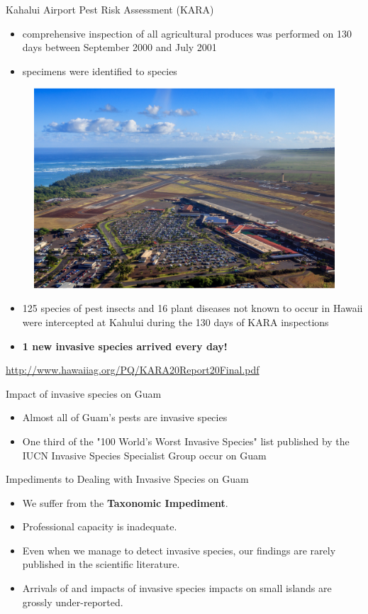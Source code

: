 \documentclass[]{beamer}
\begin{document}
\begin{frame}{Kahalui Airport Pest Risk Assessment (KARA)}
	\begin{itemize}
		\item comprehensive inspection of all agricultural produces was performed on 130 days between September 2000 and July 2001
		\item specimens were identified to species
	\end{itemize}
	\begin{figure}
		\includegraphics[height=0.35\textheight]{kahului-airport.jpg}
	\end{figure}
	\begin{itemize}
		\item 125 species of pest insects and 16 plant diseases not known to occur in Hawaii were intercepted at Kahului during the 130 days of KARA inspections
		\item \textbf{1 new invasive species arrived every day!}
	\end{itemize}
	\url{http://www.hawaiiag.org/PQ/KARA20Report20Final.pdf}
\end{frame}

\begin{frame}{Impact of invasive species on Guam}
	\begin{itemize}
		\item Almost all of Guam's pests are invasive species
		\item One third of the "100 World's Worst Invasive Species" list published by the IUCN Invasive Species Specialist Group  occur on Guam
	\end{itemize}
\end{frame}

\begin{frame}{Impediments to Dealing with Invasive Species on Guam}
	\begin{itemize}
		\item We suffer from the \textbf{Taxonomic Impediment}.
		\item Professional capacity is inadequate.
		\item Even when we manage to detect invasive species, our findings are rarely published in the scientific literature. 
		\item Arrivals of and impacts of invasive species impacts on small islands are grossly under-reported.
	\end{itemize}
\end{frame}
\end{document}
